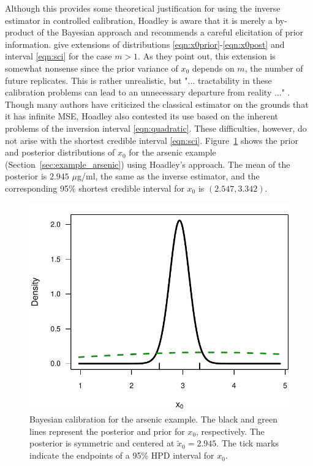 \documentclass[cmfont,usenames,dvipsnames,leqno]{afit-etd}\usepackage[]{graphicx}\usepackage[]{color}
\makeatletter
\def\maxwidth{ %
  \ifdim\Gin@nat@width>\linewidth
    \linewidth
  \else
    \Gin@nat@width
  \fi
}
\newenvironment{knitrout}{}{} %
\renewenvironment{knitrout}{\begin{singlespace}}{\end{singlespace}}
\newcommand{\wt}[1]{\ensuremath{\widetilde{#1}}}
\makeatother
\begin{document}
Although this provides some theoretical justification for using the inverse estimator in controlled calibration, Hoadley is aware that it is merely a by-product of the Bayesian approach and recommends a careful elicitation of prior information. \citet[pp. 198, 204]{aitchison_statistical_1980} give extensions of distributions \eqref{eqn:x0prior}-\eqref{eqn:x0post} and interval \eqref{eqn:sci} for the case $m > 1$. As they point out, this extension is somewhat nonsense since the prior variance of $x_0$ depends on $m$, the number of future replicates. This is rather unrealistic, but "... tractability in these calibration problems can lead to an unnecessary departure from reality ..." \citep[pp. 198]{aitchison_statistical_1980}. Though many authors have criticized the classical estimator on the grounds that it has infinite MSE, Hoadley also contested its use based on the inherent problems of the inversion interval \eqref{eqn:quadratic}. These difficulties, however, do not arise with the shortest credible interval \eqref{eqn:sci}. Figure~\ref{fig:arsenic-bayes} shows the prior and posterior distributions of $x_0$ for the arsenic example (Section~\ref{sec:example_arsenic}) using Hoadley's approach. The mean of the posterior is $2.945$ $\mu$g/ml, the same as the inverse estimator, and the corresponding 95\% shortest credible interval for $x_0$ is $(2.547, 3.342)$.  

\begin{knitrout}
\color{fgcolor}\begin{figure}[H]

\includegraphics[width=\maxwidth]{figure/arsenic-bayes} \caption[Bayesian calibration for the arsenic example]{Bayesian calibration for the arsenic example. The black and green lines represent the posterior and prior for $x_0$, respectively. The posterior is symmetric and centered at $\wt{x}_0 = 2.945$. The tick marks indicate the endpoints of a 95\% HPD interval for $x_0$.\label{fig:arsenic-bayes}}
\end{figure}


\end{knitrout}
\end{document}

